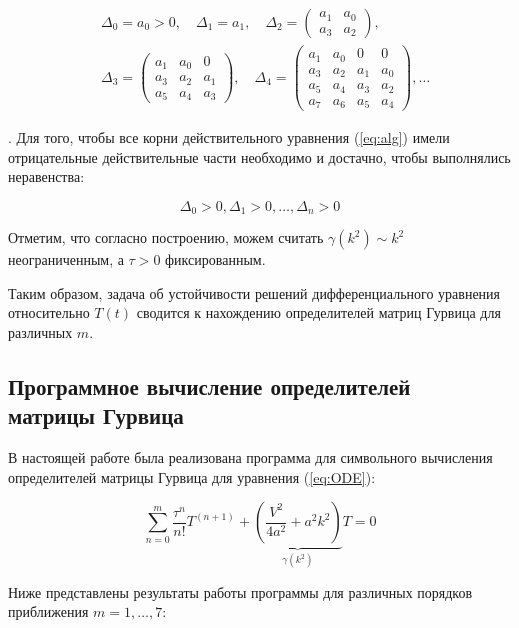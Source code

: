 \begin{align*}
& \Delta_0 = a_0 > 0, \quad \Delta_1 = a_1, \quad \Delta_2 = 
\begin{pmatrix}
a_1 & a_0\\
a_3 & a_2
\end{pmatrix},\\
& \Delta_3 = 
\begin{pmatrix}
a_1 & a_0 & 0\\
a_3 & a_2 &a_1\\
a_5 & a_4 &a_3
\end{pmatrix}, \quad \Delta_4 =
\begin{pmatrix}
a_1 & a_0 & 0 & 0\\
a_3 & a_2 & a_1 & a_0\\
a_5 & a_4 & a_3 & a_2\\
a_7 & a_6 & a_5 & a_4
\end{pmatrix}, \dots
\end{align*}

. Для того, чтобы все корни действительного уравнения (\ref{eq:alg}) имели отрицательные действительные части необходимо и достачно, чтобы выполнялись неравенства:

\begin{equation*}
\Delta_0 > 0, \Delta_1 >0, \dots, \Delta_n > 0
\end{equation*}

Отметим, что согласно построению, можем считать $\gamma(k^2) \sim k^2$ неограниченным, а $\tau > 0$ фиксированным.

Таким образом, задача об устойчивости решений дифференциального уравнения относительно $T(t)$ сводится к нахождению определителей матриц Гурвица для различных $m$.

\subsection{Программное вычисление определителей\\матрицы Гурвица}

В настоящей работе была реализована программа для символьного вычисления определителей матрицы Гурвица для уравнения (\ref{eq:ODE}):

\begin{equation*}
\sum\limits_{n=0}^{m} \dfrac{\tau^n}{n!} T^{(n+1)} + \underbrace{ \left( \dfrac{V^2}{4a^2} + a^2 k^2 \right)}_{\gamma(k^2)} T = 0
\end{equation*}

Ниже представлены результаты работы программы для различных порядков приближения $m=1,\dots,7$:

